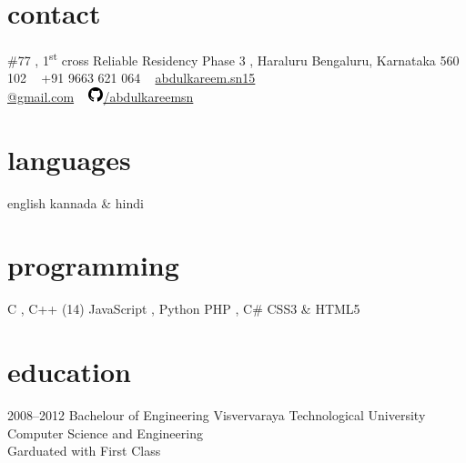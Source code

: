 \documentclass[]{friggeri-cv} %
\begin{document}


\begin{aside} %
\section{contact}
\#77 , 1\textsuperscript{st}  cross
Reliable Residency Phase 3 , Haraluru
Bengaluru, Karnataka 560 102
~
+91 9663 621 064
~
\href{mailto:abdulkareem.sn15@gmail.com}{abdulkareem.sn15\\@gmail.com}
~
\href{https://github.com/abdulkareemsn}{\includegraphics[scale=0.6]{github}/abdulkareemsn}
\section{languages}
english 
kannada \& hindi
\section{programming}
C , C++ (14)
JavaScript , Python
PHP , C\#
CSS3 \& HTML5
\end{aside}


\section{education}

\begin{entrylist}


\entry
{2008--2012}
{Bachelour {\normalfont of Engineering}}
{Visvervaraya Technological University}
{Computer Science and Engineering\\Garduated with First Class}






\end{entrylist}
\end{document}
